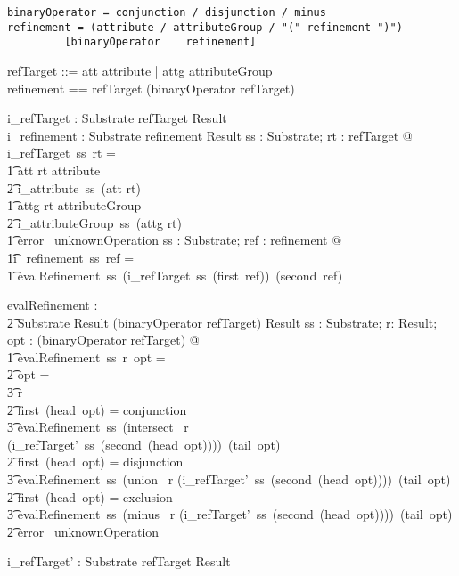 \documentclass{article}
\begin{document}
\begin{verbatim}
binaryOperator = conjunction / disjunction / minus
refinement = (attribute / attributeGroup / "(" refinement ")") 
         [binaryOperator 	refinement]
\end{verbatim}
\begin{zed}
refTarget ::= att \ldata attribute \rdata | attg \ldata attributeGroup \rdata \\
refinement == refTarget  \cross \seq(binaryOperator \cross refTarget)\\
\end{zed}

\begin{gendef}
   i\_refTarget : Substrate \fun refTarget \fun Result \\
   i\_refinement : Substrate \fun refinement \fun Result
\where
   \forall ss : Substrate; rt : refTarget @ i\_refTarget~ss~rt = \\
\t1 \IF att \inv rt \in attribute \\
\t2 \THEN i\_attribute~ss~(att \inv rt) \\
\t1 \ELSE \IF attg \inv rt \in attributeGroup \\
\t2 \THEN i\_attributeGroup~ss~(attg \inv rt) \\
\t1 \ELSE error~ unknownOperation
\also
   \forall ss : Substrate; ref : refinement @ \\
\t1i\_refinement~ss~ref = \\
\t1 evalRefinement~ss~(i\_refTarget~ss~(first~ref))~(second~ref)
\end{gendef}

\begin{gendef}
   evalRefinement : \\
\t2 Substrate \fun Result \fun \seq (binaryOperator \cross refTarget) \fun Result
\where
   \forall ss : Substrate; r: Result; opt : \seq(binaryOperator \cross refTarget) @ \\
\t1 evalRefinement~ss~r~opt = \\
\t2 \IF opt = \langle \rangle \\
\t3 \THEN r \\
\t2 \ELSE \IF first~(head~opt) = conjunction \\
\t3  \THEN  evalRefinement~ss~(intersect~ r (i\_refTarget'~ss~(second~(head~opt))))~(tail~opt) \\
\t2 \ELSE \IF first~(head~opt)  = disjunction \\
\t3  \THEN  evalRefinement~ss~(union~ r (i\_refTarget'~ss~(second~(head~opt))))~(tail~opt) \\
\t2 \ELSE \IF first~(head~opt)  = exclusion \\
\t3  \THEN  evalRefinement~ss~(minus~ r (i\_refTarget'~ss~(second~(head~opt))))~(tail~opt) \\
\t2 \ELSE error~ unknownOperation
\end{gendef}
\begin{gendef}
   i\_refTarget' : Substrate \fun refTarget \fun Result
\end{gendef}
\end{document}
